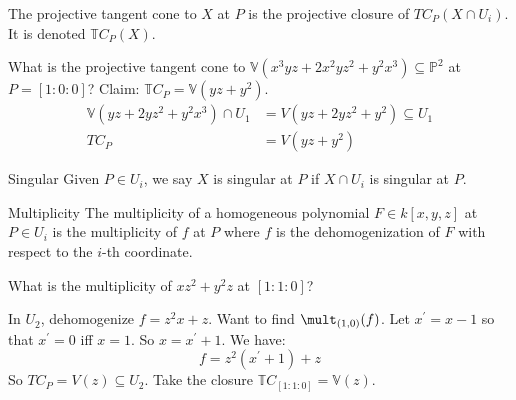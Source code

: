 \documentclass{report}
\begin{document}
The projective tangent cone to $X$ at $P$ is the projective closure of $TC_{P}(X \cap U_{i})$. It is denoted $\mathbb{T}C_{P}(X)$.

\begin{examples}
    \begin{example}
        What is the projective tangent cone to $\mathbb{V}(x^{3}yz + 2x^{2}yz^{2} + y^{2}x^{3}) \subseteq \mathbb{P}^{2}$ at $P = [1 : 0 : 0]$? Claim: $\mathbb{T}C_{P} = \mathbb{V}(yz + y^{2})$.
            \begin{align*}
                \mathbb{V}(yz + 2yz^{2} + y^{2}x^{3}) \cap U_{1} &= V(yz + 2yz^{2} + y^{2}) \subseteq U_{1} \\
                  TC_{P}                                         &= V(yz + y^{2})                             
            \end{align*}
    \end{example}
\end{examples}

\begin{definition}{Singular}
    Given $P \in U_{i}$, we say $X$ is singular at $P$ if $X \cap U_{i}$ is singular at $P$.
\end{definition}

\begin{definition}{Multiplicity}
    The multiplicity of a homogeneous polynomial $F \in k[x, y, z]$ at $P \in U_{i}$ is the multiplicity of $f$ at $P$ where $f$ is the dehomogenization of $F$ with respect to the $i$-th coordinate.
\end{definition}

\begin{examples}
    \begin{example}
        What is the multiplicity of $xz^{2} + y^{2}z$ at $[1 : 1 : 0]$?

        In $U_{2}$, dehomogenize $f = z^{2}x + z$. Want to find $\mult_{(1, 0)}(f)$. Let $x^{\prime} = x - 1$ so that $x^{\prime} = 0$ iff $x = 1$. So $x = x^{\prime} + 1$. We have:
            \begin{equation*}
                f = z^{2}(x^{\prime} + 1) + z
            \end{equation*}
        So $TC_{P} = V(z) \subseteq U_{2}$. Take the closure $\mathbb{T}C_{[1 : 1 : 0]} = \mathbb{V}(z)$.
    \end{example}
\end{examples}
\end{document}
